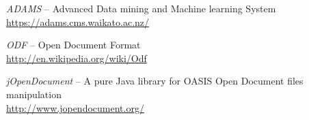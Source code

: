 %

\begin{thebibliography}{999}

		\textit{ADAMS} -- Advanced Data mining and Machine learning System \\
		\url{https://adams.cms.waikato.ac.nz/}{}
		
		\textit{ODF} -- Open Document Format \\
		\url{http://en.wikipedia.org/wiki/Odf}{}
		
		\textit{jOpenDocument} -- A pure Java library for OASIS Open Document 
		files manipulation \\
		\url{http://www.jopendocument.org/}{}

\end{thebibliography}
